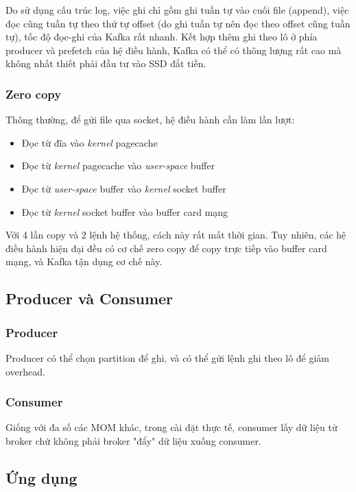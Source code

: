 \documentclass{article}
\begin{document}
Do sử dụng cấu trúc log, việc ghi chỉ gồm ghi tuần tự vào cuối file (append),
việc đọc cũng tuần tự theo thứ tự offset (do ghi tuần tự nên đọc theo offset
cũng tuần tự), tốc độ đọc-ghi của Kafka rất nhanh. Kết hợp thêm ghi theo lô ở
phía producer và prefetch của hệ điều hành, Kafka có thể có thông lượng rất cao
mà không nhất thiết phải đầu tư vào SSD đắt tiền.

\subsubsection{Zero copy}

Thông thường, để gửi file qua socket, hệ điều hành cần làm lần lượt:

\begin{itemize}
    \item Đọc từ đĩa vào \emph{kernel} pagecache
    \item Đọc từ \emph{kernel} pagecache vào \emph{user-space} buffer
    \item Đọc từ \emph{user-space} buffer vào \emph{kernel} socket buffer
    \item Đọc từ \emph{kernel} socket buffer vào buffer card mạng
\end{itemize}

Với 4 lần copy và 2 lệnh hệ thống, cách này rất mất thời gian. Tuy nhiên, các hệ
điều hành hiện đại đều có cơ chế zero copy để copy trực tiếp vào buffer card
mạng, và Kafka tận dụng cơ chế này.

\subsection{Producer và Consumer}

\subsubsection{Producer}

Producer có thể chọn partition để ghi, và có thể gửi lệnh ghi theo lô để giảm
overhead.

\subsubsection{Consumer}

Giống với đa số các MOM khác, trong cài đặt thực tế, consumer lấy dữ liệu từ
broker chứ không phải broker "đẩy" dữ liệu xuống consumer.

\subsection{Ứng dụng}
\end{document}

